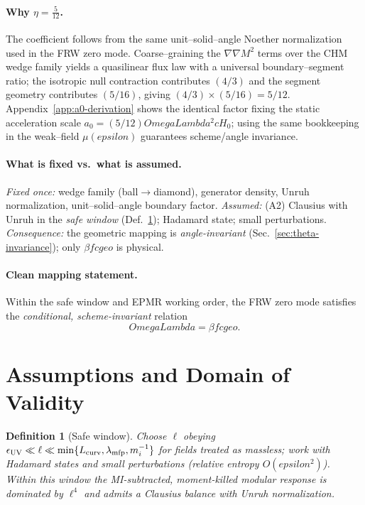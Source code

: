 \documentclass[aps,prd,onecolumn,superscriptaddress,nofootinbib]{revtex4-2}
\def\OmL{OmegaLambda}%
\def\cgeo{cgeo}%
\def\eps{epsilon}%
\newcommand{\OmL}{\Omega_\Lambda}
\newcommand{\cgeo}{c_{\rm geo}}
\newcommand{\eps}{\varepsilon}
\newtheorem{definition}{Definition}
\begin{document}
\paragraph{Why $\eta=\frac{5}{12}$.}
The coefficient follows from the same unit--solid--angle Noether normalization used in the FRW zero mode. Coarse--graining the $\nabla\nabla M^2$ terms over the CHM wedge family yields a quasilinear flux law with a universal boundary--segment ratio; the isotropic null contraction contributes $(4/3)$ and the segment geometry contributes $(5/16)$, giving $(4/3)\times(5/16)=5/12$. Appendix~\ref{app:a0-derivation} shows the identical factor fixing the static acceleration scale $a_0=(5/12)\OmL^2 cH_0$; using the same bookkeeping in the weak--field $\mu(\eps)$ guarantees scheme/angle invariance.

\paragraph{What is fixed vs.\ what is assumed.}
\emph{Fixed once:} wedge family (ball$\to$diamond), generator density, Unruh normalization, unit--solid--angle boundary factor. \emph{Assumed:} (A2) Clausius with Unruh in the \emph{safe window} (Def.\ \ref{def:safe-window}); Hadamard state; small perturbations. \emph{Consequence:} the geometric mapping is \emph{angle-invariant} (Sec.\ \ref{sec:theta-invariance}); only $\beta f \cgeo$ is physical.

\paragraph{Clean mapping statement.}
Within the safe window and EPMR working order, the FRW zero mode satisfies the \emph{conditional, scheme-invariant} relation
\begin{equation}
\label{eq:OmegaL-clean}
\OmL=\beta f \cgeo.
\end{equation}

\section{Assumptions and Domain of Validity}
\label{sec:assumptions}

\begin{definition}[Safe window]
\label{def:safe-window}
Choose $\ell$ obeying $\epsilon_{\rm UV}\ll \ell \ll \min\{L_{\rm curv},\lambda_{\rm mfp},m_i^{-1}\}$ for fields treated as massless; work with Hadamard states and small perturbations (relative entropy $O(\eps^2)$). Within this window the MI-subtracted, moment-killed modular response is dominated by $\ell^4$ and admits a Clausius balance with Unruh normalization.
\end{definition}
\end{document}
